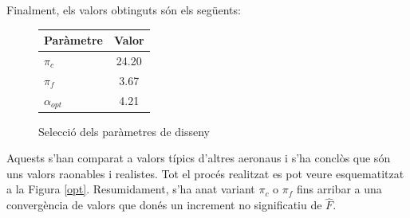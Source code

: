 Finalment, els valors obtinguts són els següents:
\begin{figure}[H]
	\centering
	\begin{tabular}{lc}
		\toprule[3pt]
		\textbf{Paràmetre}&\textbf{Valor}\\
		\midrule[1pt]
		$\pi_{c}$ & 24.20 \\
		$\pi_{f}$ & 3.67 \\
		$\alpha_{opt}$ & 4.21 \\
		\bottomrule[2pt]
	\end{tabular}
	\label{C_opti2}
	\caption{Selecció dels paràmetres de disseny}
\end{figure}
\noindent Aquests s'han comparat a valors típics d'altres aeronaus i s'ha conclòs que són uns valors raonables i realistes. Tot el procés realitzat es pot veure esquematitzat a la Figura \ref{opt}.
Resumidament, s'ha anat variant $\pi_c$ o $\pi_f$ fins arribar a una convergència de valors que donés un increment no significatiu de $\hat{F}$.  
